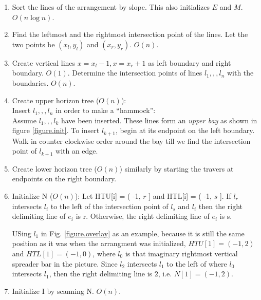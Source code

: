 \documentclass[12pt]{article}
\begin{document}
        \begin{enumerate}
            \item  Sort the lines of the arrangement by slope. This also initializes $E$ and $M$. $O(n\log n)$.
            \item  Find the leftmost and the rightmost intersection point of the
                lines. Let the two points be $(x_{l},y_{l})$ and $(x_{r},y_{r})$. $O(n)$.
            \item Create vertical lines $x = x_{l} - 1 , x = x_{r} + 1 $ as left
                boundary and right boundary. $O(1)$. Determine the intersection points of  lines $l_{1}, , , l_{n}$ with the boundaries. $O(n)$.
            \item Create upper horizon tree ($O(n)$):\\
                Insert $l_{1}, , , l_{n}$ in order to make a ``hammock'': \\
                Assume $l_{1}, , , l_{k}$ have been inserted. These lines form
                an {\em upper bay} as shown in figure \ref{figure.init}. To insert
                $l_{k+1}$, begin at its endpoint on the left boundary. Walk in
                counter clockwise order around the bay till we find the
                intersection point of $l_{k+1}$ with an edge.
            \item Create lower horizon tree ($O(n)$) similarly by starting the travers at endpoints on the right boundary.
            \item Initialize N ($O(n)$):
                Let HTU[i] = ( -1, $r$ ] and HTL[i] = ( -1, $s$ ].  If $l_{r}$
                intersects $l_{i}$ to the left of the intersection point of
                $l_{s}$ and $l_{i}$ then the right delimiting line of $e_{i}$
                is r. Otherwise, the right delimiting line of $e_{i}$ is s.

                USing $l_1$ in Fig. \ref{figure.overlay} as an example, because it is still the same position as it was when the arrangment was initialized, $HTU[1] = (-1, 2)$ and $HTL[1] = (-1, 0)$, where $l_0$ is that imaginary rightmost vertical spreader bar in the picture. Since $l_2$ intersects $l_1$ to the left of where $l_0$ intersects $l_1$, then the right delimiting line is $2$, i.e. $N[1] = (-1, 2)$.

            \item Initialize I by scanning N. $O(n)$.
        \end{enumerate}
\end{document}
